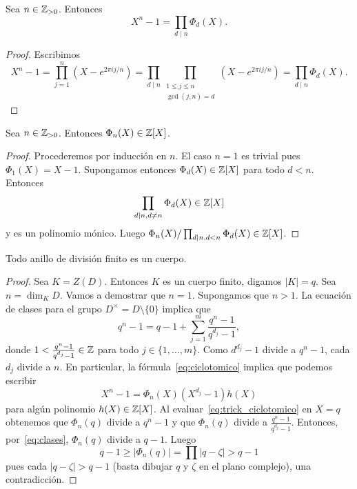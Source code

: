 \begin{lemma}
	Sea $n\in\mathbb{Z}_{>0}$. Entonces 
	\[
		X^n-1=\prod_{d\mid n}\Phi_d(X).
	\]
\end{lemma}

\begin{proof}
	Escribimos
	\[
		X^n-1=\prod_{j=1}^n (X-e^{2\pi ij/n})
		=\prod_{d\mid n}\prod_{\substack{1\leq j\leq n\\\gcd(j,n)=d}}(X-e^{2\pi ij/n})
		=\prod_{d\mid n}\Phi_d(X).
	\]
\end{proof}

\begin{lemma}
	Sea $n\in\mathbb{Z}_{>0}$. Entonces $\Phi_n(X)\in\mathbb{Z}[X]$.
\end{lemma}

\begin{proof}
	Procederemos por inducción en $n$. El caso $n=1$ es trivial pues
	$\Phi_1(X)=X-1$. Supongamos entonces $\Phi_d(X)\in\mathbb{Z}[X]$ para todo $d<n$.
	Entonces 
	\[
		\prod_{d\mid n,d\ne n}\Phi_d(X)\in\mathbb{Z}[X]
	\]
	y es un polinomio mónico. Luego $\Phi_n(X)/\prod_{d\mid
	n,d<n}\Phi_d(X)\in\mathbb{Z}[X]$.
\end{proof}

\begin{theorem}[Wedderburn]
	Todo anillo de división finito es un cuerpo. 
\end{theorem}

\begin{proof}
	Sea $K=Z(D)$. Entonces $K$ es un cuerpo finito, digamos $|K|=q$. Sea
	$n=\dim_KD$.  Vamos a demostrar que $n=1$. Supongamos que $n>1$. 
	La ecuación de clases para el grupo $D^\times=D\setminus\{0\}$ implica que
	\begin{equation}
		\label{eq:clases}
		q^n-1=q-1+\sum_{j=1}^m \frac{q^n-1}{q^{d_j}-1},
	\end{equation}
	donde $1<\frac{q^n-1}{q^{d_j}-1}\in\mathbb{Z}$ para todo $j\in\{1,\dots,m\}$. 
	Como $d^{d_j}-1$ divide a $q^n-1$, cada $d_j$ divide a $n$. En particular,
	la fórmula~\eqref{eq:ciclotomico} implica que podemos escribir
	\begin{equation}
		\label{eq:trick_ciclotomico}
		X^n-1=\Phi_n(X)(X^{d_j}-1)h(X)
	\end{equation}
	para algún polinomio $h(X)\in\mathbb{Z}[X]$. 
	Al evaluar~\eqref{eq:trick_ciclotomico} en $X=q$  
	obtenemos que $\Phi_n(q)$ divide a $q^n-1$ y que $\Phi_n(q)$
	divide a $\frac{q^n-1}{q^{d_j}-1}$. Entonces, por~\eqref{eq:clases}, 
	$\Phi_n(q)$ divide a $q-1$. Luego 
	\[
		q-1\geq |\Phi_n(q)|=\prod |q-\zeta|>q-1
	\]
	pues cada $|q-\zeta|>q-1$ (basta dibujar $q$ y $\zeta$ en el plano
	complejo), una contradicción.
\end{proof}

